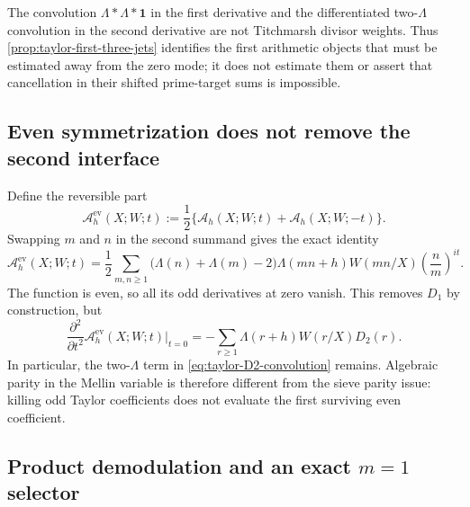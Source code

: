 The convolution $\Lambda*\Lambda*\mathbf 1$ in the first derivative and
the differentiated two-$\Lambda$ convolution in the second derivative are
not Titchmarsh divisor weights.  Thus
\cref{prop:taylor-first-three-jets} identifies the first arithmetic objects
that must be estimated away from the zero mode; it does not estimate them
or assert that cancellation in their shifted prime-target sums is
impossible.

\subsection{Even symmetrization does not remove the second interface}
\label{subsec:taylor-even-symmetrization}

Define the reversible part
\begin{equation}
 \mathcal A_h^{\mathrm{ev}}(X;W;t)
 :=\frac12\bigl\{\mathcal A_h(X;W;t)
                  +\mathcal A_h(X;W;-t)\bigr\}.
 \label{eq:taylor-even-definition}
\end{equation}
Swapping $m$ and $n$ in the second summand gives the exact identity
\begin{equation}
 \mathcal A_h^{\mathrm{ev}}(X;W;t)
 =\frac12\sum_{m,n\geq1}
   \bigl(\Lambda(n)+\Lambda(m)-2\bigr)
   \Lambda(mn+h)W(mn/X)
   \left(\frac{n}{m}\right)^{it}.
 \label{eq:taylor-even-swapped}
\end{equation}
The function is even, so all its odd derivatives at zero vanish.  This
removes $D_1$ by construction, but
\begin{equation}
 \frac{\partial^2}{\partial t^2}
 \mathcal A_h^{\mathrm{ev}}(X;W;t)\bigg|_{t=0}
 =-\sum_{r\geq1}\Lambda(r+h)W(r/X)D_2(r).
 \label{eq:taylor-even-second-derivative}
\end{equation}
In particular, the two-$\Lambda$ term in
\eqref{eq:taylor-D2-convolution} remains.  Algebraic parity in the Mellin
variable is therefore different from the sieve parity issue: killing odd
Taylor coefficients does not evaluate the first surviving even
coefficient.

\subsection{Product demodulation and an exact
\texorpdfstring{$m=1$}{m=1} selector}
\label{subsec:selector-two-mellin}

